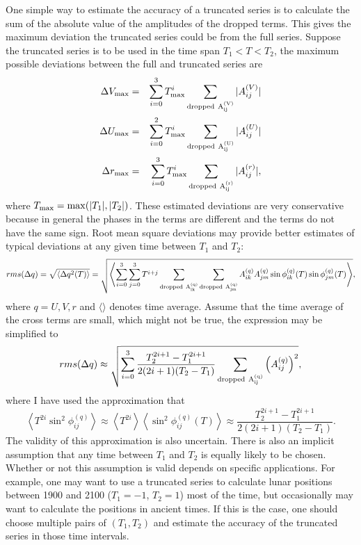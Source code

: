\documentclass[12pt]{article}
\newcommand \beq {\begin{equation}}
\newcommand \eeq {\end{equation}}
\newcommand \beqn {\begin{eqnarray}}
\newcommand \eeqn {\end{eqnarray}}
\begin{document}
One simple way to estimate the accuracy of a truncated series is to calculate the 
sum of the absolute value of the amplitudes of the dropped terms. This gives the 
maximum deviation the truncated series could be from the full series. Suppose the 
truncated series is to be used in the time span $T_1 < T < T_2$, the maximum possible 
deviations between the full and truncated series are
\beqn
  \Delta V_{\rm max} &=& \sum_{i=0}^3 T_{\rm max}^i \sum_{\rm dropped~{A_{ij}^{(V)}}} |A_{ij}^{(V)}| \label{eq:DeltaVmax} \\
  \Delta U_{\rm max} &=& \sum_{i=0}^2 T_{\rm max}^i \sum_{\rm dropped~{A_{ij}^{(U)}}} |A_{ij}^{(U)}| \label{eq:DeltaUmax} \\
  \Delta r_{\rm max} &=& \sum_{i=0}^3 T_{\rm max}^i \sum_{\rm dropped~{A_{ij}^{(r)}}} |A_{ij}^{(r)}| , \label{eq:Deltarmax}
\eeqn
where $T_{\rm max} = {\rm max}(|T_1|, |T_2|)$. These estimated deviations are 
very conservative because 
in general the phases in the terms are different and the terms do not have the same sign. 
Root mean square deviations may provide better estimates of typical deviations at any 
given time between $T_1$ and $T_2$: 
\beq
 rms(\Delta q) = \sqrt{ \langle \Delta q^2(T) \rangle}  = \sqrt{ \left\langle \sum_{i=0}^3 \sum_{j=0}^3 T^{i+j} 
\sum_{\rm dropped~{A_{ik}^{(q)}}} \sum_{\rm dropped~{A_{jm}^{(q)}}} 
A_{ik}^{(q)} A_{jm}^{(q)} \sin \phi_{ik}^{(q)}(T) \sin \phi_{jm}^{(q)}(T) \right\rangle } ,
\eeq
where $q=U,V,r$ and $\langle \rangle$ denotes time average. Assume that the time 
average of the cross terms are small, which might not be true, the expression 
may be simplified to 
\beq
  rms(\Delta q) \approx \sqrt{ \sum_{i=0}^3 \frac{T_2^{2i+1}-T_1^{2i+1}}{2(2i+1)(T_2-T_1)} 
\sum_{\rm dropped~{A_{ij}^{(q)}}} \left( A_{ij}^{(q)}\right)^2 } ,
\label{eq:rmsDeltaq}
\eeq
where I have used the approximation that 
\beq
  \left\langle T^{2i} \sin^2 \phi_{ij}^{(q)} \right\rangle \approx 
\left\langle T^{2i}  \right\rangle \left\langle \sin^2 \phi_{ij}^{(q)}(T) \right\rangle 
\approx \frac{T_2^{2i+1}-T_1^{2i+1}}{2(2i+1)(T_2-T_1)} .
\eeq
The validity of this approximation is also uncertain. There is also an implicit  
assumption that any time between $T_1$ and $T_2$ is equally likely to be chosen. 
Whether or not this assumption is valid depends on specific applications. For example, one 
may want to use a truncated series to calculate lunar positions between 1900 and 2100 
($T_1=-1$, $T_2=1$)
most of the time, but occasionally may want to calculate the positions in ancient times. 
If this is the case, one should choose multiple pairs of $(T_1, T_2)$ and 
estimate the accuracy of the truncated series in those time intervals.
\end{document}
